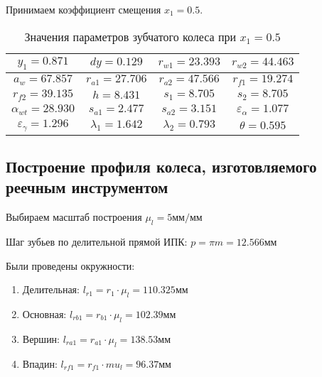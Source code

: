 Принимаем коэффициент смещения $x_1 = 0.5$.

\begin{table}[b]
	\caption{Значения параметров зубчатого колеса при $x_1 = 0.5$}
	\begin{tabular}{|c|c|c|c|}
		\hline 
		$y_1 = 0.871$ & $dy = 0.129$ &  $r_{w1} = 23.393$ & $r_{w2} = 44.463$ \\ 
		\hline 
		$a_w = 67.857$ & $r_{a1} = 27.706$ & $r_{a2} = 47.566$ & $r_{f1} = 19.274$ \\ 
		\hline 
		$r_{f2} = 39.135$ & $h = 8.431$ & $s_1 = 8.705$ & $s_2 = 8.705$ \\ 
		\hline 
		$\alpha_{wt} = 28.930$ & $s_{a1} = 2.477$ & $s_{a2} = 3.151$ & $\varepsilon_{\alpha} = 1.077$ \\ 
		\hline 
		$\varepsilon_{\gamma} = 1.296$ & $\lambda_1 = 1.642$ & $\lambda_2 = 0.793$ & $\theta = 0.595$ \\ 
		\hline 
	\end{tabular} 
	\label{final_table}
\end{table}

\subsection{Построение профиля колеса, изготовляемого реечным инструментом}

Выбираем масштаб построения $\mu_l = 5 мм/мм$

Шаг зубьев по делительной прямой ИПК: $p = \pi m = 12.566мм$


Были проведены окружности:

\begin{enumerate}
	\item Делительная: $l_{r1} = r_1 \cdot \mu_l = 110.325 мм$
	\item Основная: $l_{rb1} = r_{b1} \cdot \mu_l = 102.39 мм$
	\item Вершин: $l_{ra1} = r_{a1} \cdot \mu_l = 138.53 мм$
	\item Впадин: $l_{rf1} = r_{f1} \cdot mu_l = 96.37 мм$
\end{enumerate}

